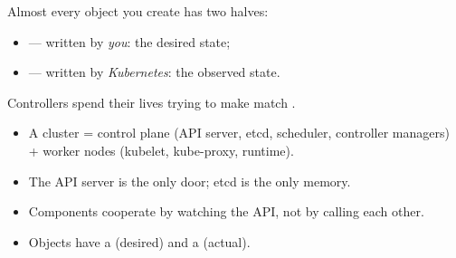 Almost every object you create has two halves:

\begin{itemize}
  \item {} --- written by \emph{you}: the desired state;
  \item {} --- written by \emph{Kubernetes}: the observed state.
\end{itemize}

Controllers spend their lives trying to make  match .

\begin{recap}
\begin{itemize}
  \item A cluster = control plane (API server, etcd, scheduler, controller
        managers) + worker nodes (kubelet, kube-proxy, runtime).
  \item The API server is the only door; etcd is the only memory.
  \item Components cooperate by watching the API, not by calling each other.
  \item Objects have a  (desired) and a  (actual).
\end{itemize}
\end{recap}
